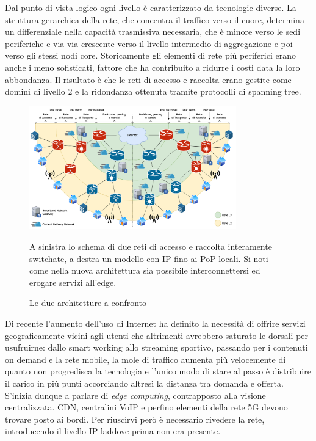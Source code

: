 Dal punto di vista logico ogni livello è caratterizzato da tecnologie diverse. La struttura gerarchica della rete, che concentra il traffico verso il cuore, determina un differenziale nella capacità trasmissiva necessaria, che è minore verso le sedi periferiche e via via crescente verso il livello intermedio di aggregazione e poi verso gli stessi nodi core. Storicamente gli elementi di rete più periferici erano anche i meno sofisticati, fattore che ha contribuito a ridurre i costi data la loro abbondanza. Il risultato è che le reti di accesso e raccolta erano gestite come domini di livello 2 e la ridondanza ottenuta tramite protocolli di spanning tree.

\begin{figure}[htb]
    \includegraphics[width=0.8\textwidth]{graphics/isp-arch.png}
    \caption{Le due architetture a confronto}
    \label{fig:isp-arch}
    \begin{adjustwidth}{0.1\textwidth}{0.1\textwidth}
        \centering
        \footnotesize A sinistra lo schema di due reti di accesso e raccolta interamente switchate, a destra un modello con IP fino ai PoP locali. Si noti come nella nuova architettura sia possibile interconnettersi ed erogare servizi all'edge.
    \end{adjustwidth}
\end{figure}

Di recente l'aumento dell'uso di Internet ha definito la necessità di offrire servizi geograficamente vicini agli utenti che altrimenti avrebbero saturato le dorsali per usufruirne: dallo smart working allo streaming sportivo, passando per i contenuti on demand e la rete mobile, la mole di traffico aumenta più velocemente di quanto non progredisca la tecnologia e l'unico modo di stare al passo è distribuire il carico in più punti accorciando altresì la distanza tra domanda e offerta. S'inizia dunque a parlare di \textit{edge computing}, contrapposto alla visione centralizzata. CDN, centralini VoIP e perfino elementi della rete 5G devono trovare posto ai bordi. Per riuscirvi però è necessario rivedere la rete, introducendo il livello IP laddove prima non era presente.


